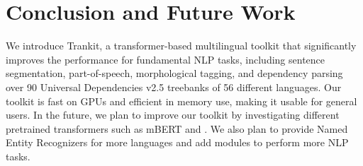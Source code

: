 \documentclass[11pt,a4paper]{article}
\begin{document}
\section{Conclusion and Future Work}
We introduce Trankit, a transformer-based multilingual toolkit that significantly improves the performance for fundamental NLP tasks, including sentence segmentation, part-of-speech, morphological tagging, and dependency parsing over 90 Universal Dependencies v2.5 treebanks of 56 different languages. Our toolkit is fast on GPUs and efficient in memory use, making it usable for general users. In the future, we plan to improve our toolkit by investigating different pretrained transformers such as mBERT and . We also plan to provide Named Entity Recognizers for more languages and add modules to perform more NLP tasks.







\end{document}
